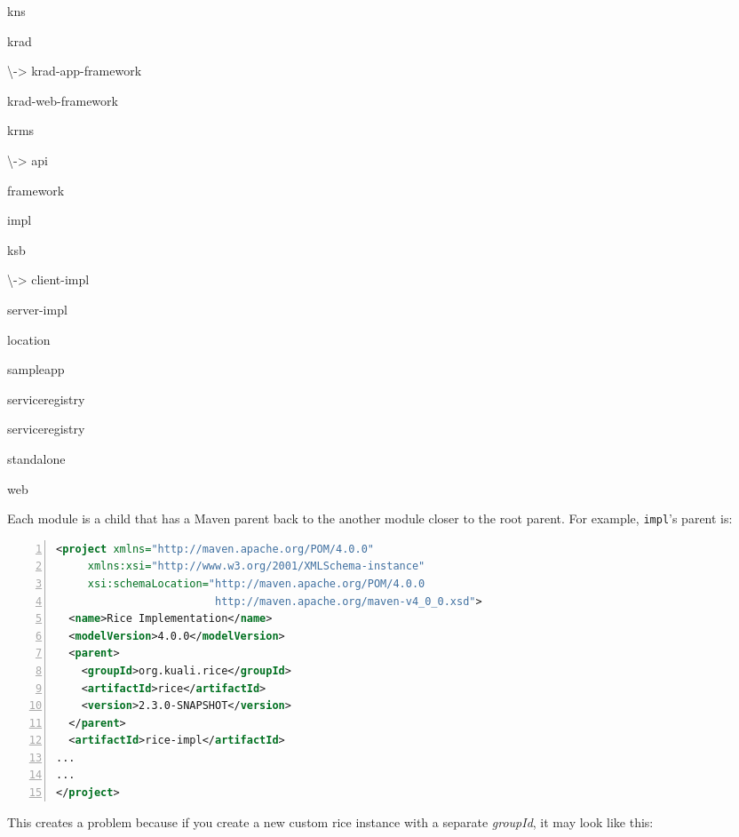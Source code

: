 \documentclass[12pt,notitlepage]{article}
\begin{document}
{\begin{list}{|->}{\setlength{\leftmargin}{1em}}
\begin{list}{|->}{\setlength{\leftmargin}{1em}}
  \item kns
  \item krad
    \begin{list}{|->}{\setlength{\leftmargin}{0.5em}}
    \item[\textbackslash->] krad-app-framework
    \item krad-web-framework
    \end{list}
  \item krms
    \begin{list}{|->}{\setlength{\leftmargin}{0.5em}}
    \item[\textbackslash->] api
    \item framework
    \item impl
    \end{list}
  \item ksb
    \begin{list}{|->}{\setlength{\leftmargin}{0.5em}}
    \item[\textbackslash->] client-impl
    \item server-impl
    \end{list} 
  \item location
  \item sampleapp
  \item serviceregistry
  \item serviceregistry
  \item standalone
  \item web
  \end{list}
\end{list}}

Each module is a child that has a Maven parent back to the another module closer to the root parent. For example, \texttt{impl}'s parent is:
\begin{lstlisting}[numbers=left,language=xml,basicstyle=\scriptsize,backgroundcolor=\color{ubergray},caption={Impl Module Parent Definition},frame=single,breaklines=true]
<project xmlns="http://maven.apache.org/POM/4.0.0" 
     xmlns:xsi="http://www.w3.org/2001/XMLSchema-instance" 
     xsi:schemaLocation="http://maven.apache.org/POM/4.0.0 
                         http://maven.apache.org/maven-v4_0_0.xsd">
  <name>Rice Implementation</name>
  <modelVersion>4.0.0</modelVersion>
  <parent>
    <groupId>org.kuali.rice</groupId>
    <artifactId>rice</artifactId>
    <version>2.3.0-SNAPSHOT</version>
  </parent>
  <artifactId>rice-impl</artifactId>
...
...
</project>
  \end{lstlisting}

This creates a problem because if you create a new custom rice instance with a separate \emph{groupId}, it may look like this:
\end{document}
